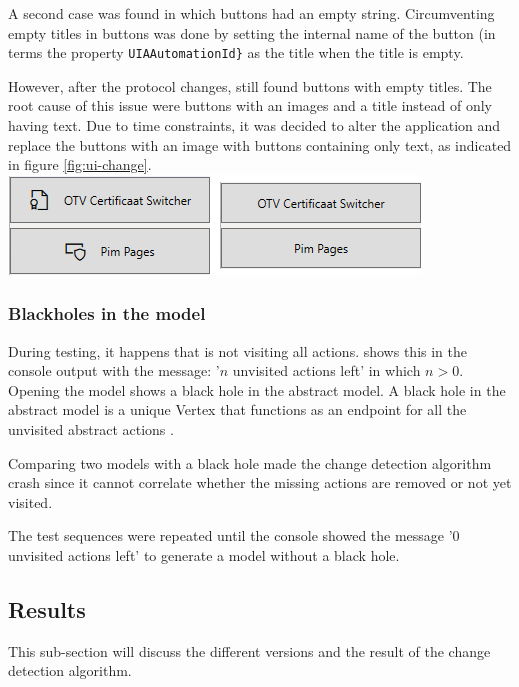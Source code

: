 A second case was found in which buttons had an empty string. Circumventing empty titles in buttons was done by setting the internal name of the button (in \testar terms the property \verb|UIAAutomationId}| as the title when the title is empty.

However, after the protocol changes, \testar still found buttons with empty titles. The root cause of this issue were buttons with an images and a title instead of only having text. Due to time constraints, it was decided to alter the application and replace the buttons with an image with buttons containing only text, as indicated in figure \ref{fig:ui-change}.\\

\begingroup
\captionsetup{type=figure}
\includegraphics[scale=1]{images/6-Experiment/ui-change.png}
\label{fig:ui-change}
\endgroup

\subsubsection{Blackholes in the model}
During testing, it happens that \testar is not visiting all actions. \testar shows this in the console output with the message: '$n$ unvisited actions left' in which $n > 0$. Opening the model shows a black hole in the abstract model. A black hole in the \testar abstract model is a unique Vertex that functions as an endpoint for all the unvisited abstract actions \cite{mulders2022Statemodel}. 

Comparing two models with a black hole made the change detection algorithm crash since it cannot correlate whether the missing actions are removed or not yet visited. 

The test sequences were repeated until the console showed the message  '0 unvisited actions left' to generate a model without a black hole.

\subsection{Results}
This sub-section will discuss the different versions and the result of the change detection algorithm.

